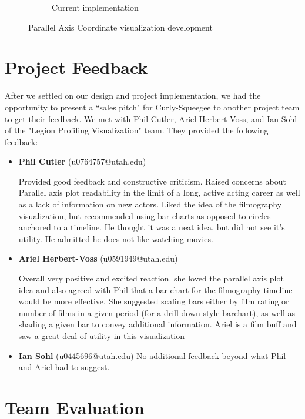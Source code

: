 \documentclass[12pt]{article}
\begin{document}
\begin{figure}[h!]
\begin{subfigure}[t]{.8\textwidth}
			  \caption{Current implementation}
			  \label{fig:sub2}
		\end{subfigure}%
		\caption{Parallel Axis Coordinate visualization development}
		\label{fig:parallelAxisCoordVis}
	\end{figure}

\newpage

\section{Project Feedback} \label{sec:Projcet Feedback}

After we settled on our design and project implementation, we had the opportunity to present a ``sales pitch"  for Curly-Squeegee to another project team to get their feedback.  We met with Phil Cutler, Ariel Herbert-Voss, and Ian Sohl of the "Legion Profiling Visualization" team. They provided the following feedback:

\begin{itemize}
	\item \textbf{Phil Cutler} (u0764757@utah.edu)
	
	Provided good feedback and constructive criticism. Raised concerns about Parallel axis plot readability in the limit of a long, active acting career as well as a lack of information on new actors. Liked the idea of the filmography visualization, but recommended using bar charts as opposed to circles anchored to a timeline. He thought it was a neat idea, but did not see it's utility. He admitted he does not like watching movies.
	
	
	\item \textbf{Ariel Herbert-Voss} (u0591949@utah.edu)
	
	Overall very positive and excited reaction. she loved the parallel axis plot idea and also agreed with Phil that a bar chart for the filmography timeline would be more effective. She suggested scaling bars either by film rating or number of films in a given period (for a drill-down style barchart), as well as shading a given bar to convey additional information. Ariel is a film buff and saw a great deal of utility in this visualization
	
	\item \textbf{Ian Sohl} (u0445696@utah.edu)
		No additional feedback beyond what Phil and Ariel had to suggest.
\end{itemize}

\newpage

\section{Team Evaluation}
\end{document}
